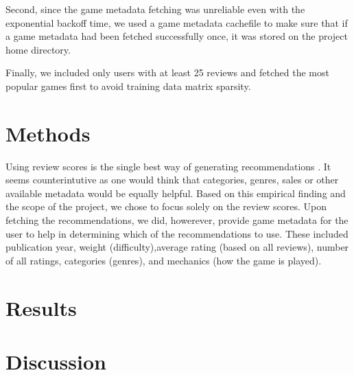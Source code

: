 \documentclass[a4paper,12pt,bibliography=totoc,numbers=noenddot,sfdefaults=false,abstract=true,notitlepage]{scrartcl} %
\begin{document}
	Second, since the game metadata fetching was unreliable even with the exponential backoff time, we used a game metadata cachefile to make sure that if a game metadata had been fetched successfully once, it was stored  on the project home directory.

	Finally, we included only users with at least 25 reviews and fetched the most popular games first to avoid training data matrix sparsity.
	
	
	\section{Methods}\label{methods}

	Using review scores is the single best way of generating recommendations \autocite{epsteinRangeWhyGeneralists2021}. It seems counterintutive as one would think that categories, genres, sales or other available metadata would be equally helpful. Based on this empirical finding and the scope of the project, we chose to focus solely on the review scores. Upon fetching the recommendations, we did, howerever, provide game metadata for the user to help in determining which of the recommendations to use. These included publication year, weight (difficulty),average rating (based on all reviews), number of all ratings, categories (genres), and mechanics (how the game is played). 





	
	
	
	\section{Results}\label{results}
	
	
	
	
	
	
	
	
	\section{Discussion}\label{discussion}
\end{document}
